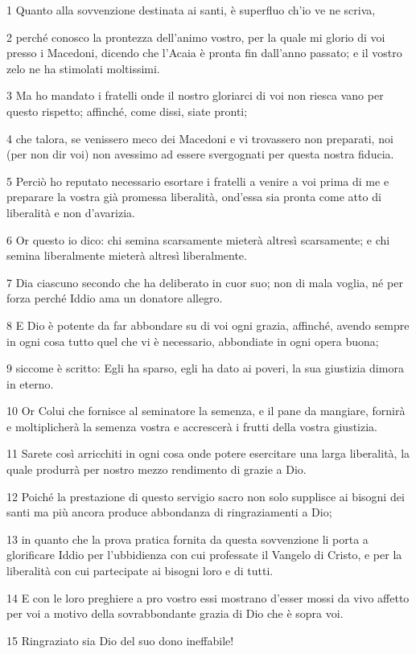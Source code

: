 \par 1 Quanto alla sovvenzione destinata ai santi, è superfluo ch'io ve ne scriva,
\par 2 perché conosco la prontezza dell'animo vostro, per la quale mi glorio di voi presso i Macedoni, dicendo che l'Acaia è pronta fin dall'anno passato; e il vostro zelo ne ha stimolati moltissimi.
\par 3 Ma ho mandato i fratelli onde il nostro gloriarci di voi non riesca vano per questo rispetto; affinché, come dissi, siate pronti;
\par 4 che talora, se venissero meco dei Macedoni e vi trovassero non preparati, noi (per non dir voi) non avessimo ad essere svergognati per questa nostra fiducia.
\par 5 Perciò ho reputato necessario esortare i fratelli a venire a voi prima di me e preparare la vostra già promessa liberalità, ond'essa sia pronta come atto di liberalità e non d'avarizia.
\par 6 Or questo io dico: chi semina scarsamente mieterà altresì scarsamente; e chi semina liberalmente mieterà altresì liberalmente.
\par 7 Dia ciascuno secondo che ha deliberato in cuor suo; non di mala voglia, né per forza perché Iddio ama un donatore allegro.
\par 8 E Dio è potente da far abbondare su di voi ogni grazia, affinché, avendo sempre in ogni cosa tutto quel che vi è necessario, abbondiate in ogni opera buona;
\par 9 siccome è scritto: Egli ha sparso, egli ha dato ai poveri, la sua giustizia dimora in eterno.
\par 10 Or Colui che fornisce al seminatore la semenza, e il pane da mangiare, fornirà e moltiplicherà la semenza vostra e accrescerà i frutti della vostra giustizia.
\par 11 Sarete così arricchiti in ogni cosa onde potere esercitare una larga liberalità, la quale produrrà per nostro mezzo rendimento di grazie a Dio.
\par 12 Poiché la prestazione di questo servigio sacro non solo supplisce ai bisogni dei santi ma più ancora produce abbondanza di ringraziamenti a Dio;
\par 13 in quanto che la prova pratica fornita da questa sovvenzione li porta a glorificare Iddio per l'ubbidienza con cui professate il Vangelo di Cristo, e per la liberalità con cui partecipate ai bisogni loro e di tutti.
\par 14 E con le loro preghiere a pro vostro essi mostrano d'esser mossi da vivo affetto per voi a motivo della sovrabbondante grazia di Dio che è sopra voi.
\par 15 Ringraziato sia Dio del suo dono ineffabile!

